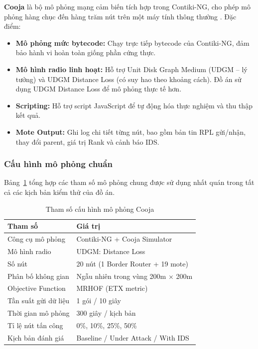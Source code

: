\textbf{Cooja} là bộ mô phỏng mạng cảm biến tích hợp trong Contiki-NG,
cho phép mô phỏng hàng chục đến hàng trăm nút trên một máy tính thông
thường \cite{overview_rpl_framework}. Đặc điểm:

\begin{itemize}
    \item \textbf{Mô phỏng mức bytecode:} Chạy trực tiếp bytecode của
          Contiki-NG, đảm bảo hành vi hoàn toàn giống phần cứng thực.
    \item \textbf{Mô hình radio linh hoạt:} Hỗ trợ Unit Disk Graph
          Medium (UDGM -- lý tưởng) và UDGM Distance Loss (có suy hao
          theo khoảng cách). Đồ án sử dụng UDGM Distance Loss để mô
          phỏng thực tế hơn.
    \item \textbf{Scripting:} Hỗ trợ script JavaScript để tự động hóa
          thực nghiệm và thu thập kết quả.
    \item \textbf{Mote Output:} Ghi log chi tiết từng nút, bao gồm
          bản tin RPL gửi/nhận, thay đổi parent, giá trị Rank và cảnh
          báo IDS.
\end{itemize}

\subsubsection{Cấu hình mô phỏng chuẩn}

Bảng~\ref{tab:sim_config} tổng hợp các tham số mô phỏng chung được sử
dụng nhất quán trong tất cả các kịch bản kiểm thử của đồ án.

\begin{table}[H]
\centering
\caption{Tham số cấu hình mô phỏng Cooja}
\label{tab:sim_config}
\begin{tabularx}{\textwidth}{lX}
    \toprule
    \textbf{Tham số} & \textbf{Giá trị} \\
    \midrule
    Công cụ mô phỏng      & Contiki-NG + Cooja Simulator \\
    Mô hình radio          & UDGM: Distance Loss \\
    Số nút                 & 20 nút (1 Border Router + 19 mote) \\
    Phân bố không gian     & Ngẫu nhiên trong vùng 200m $\times$ 200m \\
    Objective Function     & MRHOF (ETX metric) \\
    Tần suất gửi dữ liệu  & 1 gói / 10 giây \\
    Thời gian mô phỏng     & 300 giây / kịch bản \\
    Tỉ lệ nút tấn công     & 0\%, 10\%, 25\%, 50\% \\
    Kịch bản đánh giá      & Baseline / Under Attack / With IDS \\
    \bottomrule
\end{tabularx}
\end{table}

